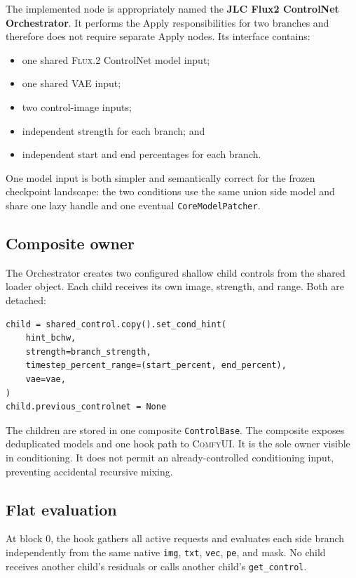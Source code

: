 \documentclass[11pt]{article}
\newcommand{\FluxTwo}{\textsc{Flux.2}}
\newcommand{\ComfyUI}{\textsc{ComfyUI}}
\newcommand{\code}[1]{\texttt{#1}}
\begin{document}
The implemented node is appropriately named the \textbf{JLC Flux2 ControlNet Orchestrator}. It performs the Apply responsibilities for two branches and therefore does not require separate Apply nodes. Its interface contains:

\begin{itemize}
  \item one shared \FluxTwo{} ControlNet model input;
  \item one shared VAE input;
  \item two control-image inputs;
  \item independent strength for each branch; and
  \item independent start and end percentages for each branch.
\end{itemize}

One model input is both simpler and semantically correct for the frozen checkpoint landscape: the two conditions use the same union side model and share one lazy handle and one eventual \code{CoreModelPatcher}.

\subsection{Composite owner}

The Orchestrator creates two configured shallow child controls from the shared loader object. Each child receives its own image, strength, and range. Both are detached:

\begin{lstlisting}[style=pythonstyle,caption={Conceptual detached-child construction.}]
child = shared_control.copy().set_cond_hint(
    hint_bchw,
    strength=branch_strength,
    timestep_percent_range=(start_percent, end_percent),
    vae=vae,
)
child.previous_controlnet = None
\end{lstlisting}

The children are stored in one composite \code{ControlBase}. The composite exposes deduplicated models and one hook path to \ComfyUI{}. It is the sole owner visible in conditioning. It does not permit an already-controlled conditioning input, preventing accidental recursive mixing.

\subsection{Flat evaluation}

At block 0, the hook gathers all active requests and evaluates each side branch independently from the same native \code{img}, \code{txt}, \code{vec}, \code{pe}, and mask. No child receives another child's residuals or calls another child's \code{get\_control}.
\end{document}
